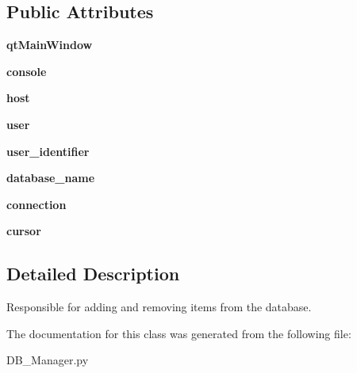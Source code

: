 \subsection*{Public Attributes}
\begin{DoxyCompactItemize}
\item 
\hypertarget{classDB__Manager_1_1DatabaseManager_af5c5fbb7f0ae4feb627c31cf15b39b30}{{\bfseries qt\-Main\-Window}}\label{classDB__Manager_1_1DatabaseManager_af5c5fbb7f0ae4feb627c31cf15b39b30}

\item 
\hypertarget{classDB__Manager_1_1DatabaseManager_a0029a0322d567089d5c28a23bc4687f1}{{\bfseries console}}\label{classDB__Manager_1_1DatabaseManager_a0029a0322d567089d5c28a23bc4687f1}

\item 
\hypertarget{classDB__Manager_1_1DatabaseManager_a498a03657a44fafdda73b629df5547e3}{{\bfseries host}}\label{classDB__Manager_1_1DatabaseManager_a498a03657a44fafdda73b629df5547e3}

\item 
\hypertarget{classDB__Manager_1_1DatabaseManager_a4fe3d3f9cebe928982255dacabd5f6e7}{{\bfseries user}}\label{classDB__Manager_1_1DatabaseManager_a4fe3d3f9cebe928982255dacabd5f6e7}

\item 
\hypertarget{classDB__Manager_1_1DatabaseManager_a713436be57ac1ad047a1cd415562342d}{{\bfseries user\-\_\-identifier}}\label{classDB__Manager_1_1DatabaseManager_a713436be57ac1ad047a1cd415562342d}

\item 
\hypertarget{classDB__Manager_1_1DatabaseManager_a0fbc8afad6ca0a2f5be6b4b07a2396f6}{{\bfseries database\-\_\-name}}\label{classDB__Manager_1_1DatabaseManager_a0fbc8afad6ca0a2f5be6b4b07a2396f6}

\item 
\hypertarget{classDB__Manager_1_1DatabaseManager_a39178b225b3bbf4f0110e1548ea2f5ee}{{\bfseries connection}}\label{classDB__Manager_1_1DatabaseManager_a39178b225b3bbf4f0110e1548ea2f5ee}

\item 
\hypertarget{classDB__Manager_1_1DatabaseManager_a192c0591348c6df3dbe137f5439a64a2}{{\bfseries cursor}}\label{classDB__Manager_1_1DatabaseManager_a192c0591348c6df3dbe137f5439a64a2}

\end{DoxyCompactItemize}


\subsection{Detailed Description}
Responsible for adding and removing items from the database. 

The documentation for this class was generated from the following file\-:\begin{DoxyCompactItemize}
\item 
D\-B\-\_\-\-Manager.\-py\end{DoxyCompactItemize}
